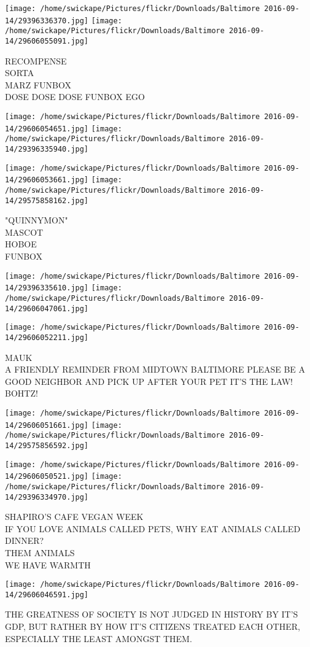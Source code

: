 \documentclass[10pt,letterpaper]{article}
\begin{document}
\texttt{[image: /home/swickape/Pictures/flickr/Downloads/Baltimore 2016-09-14/29396336370.jpg]}
\texttt{[image: /home/swickape/Pictures/flickr/Downloads/Baltimore 2016-09-14/29606055091.jpg]}

RECOMPENSE\\
SORTA\\
MARZ FUNBOX\\
DOSE DOSE DOSE FUNBOX EGO
\pagebreak

\texttt{[image: /home/swickape/Pictures/flickr/Downloads/Baltimore 2016-09-14/29606054651.jpg]}
\texttt{[image: /home/swickape/Pictures/flickr/Downloads/Baltimore 2016-09-14/29396335940.jpg]}

\texttt{[image: /home/swickape/Pictures/flickr/Downloads/Baltimore 2016-09-14/29606053661.jpg]}
\texttt{[image: /home/swickape/Pictures/flickr/Downloads/Baltimore 2016-09-14/29575858162.jpg]}

"QUINNYMON"\\
MASCOT\\
HOBOE\\
FUNBOX
\pagebreak

\texttt{[image: /home/swickape/Pictures/flickr/Downloads/Baltimore 2016-09-14/29396335610.jpg]}
\texttt{[image: /home/swickape/Pictures/flickr/Downloads/Baltimore 2016-09-14/29606047061.jpg]}

\vspace{0.25in}
\texttt{[image: /home/swickape/Pictures/flickr/Downloads/Baltimore 2016-09-14/29606052211.jpg]}

MAUK\\
A FRIENDLY REMINDER FROM MIDTOWN BALTIMORE PLEASE BE A GOOD NEIGHBOR AND PICK UP AFTER YOUR PET IT'S THE LAW!\\
BOHTZ!
\pagebreak

\texttt{[image: /home/swickape/Pictures/flickr/Downloads/Baltimore 2016-09-14/29606051661.jpg]}
\texttt{[image: /home/swickape/Pictures/flickr/Downloads/Baltimore 2016-09-14/29575856592.jpg]}

\texttt{[image: /home/swickape/Pictures/flickr/Downloads/Baltimore 2016-09-14/29606050521.jpg]}
\texttt{[image: /home/swickape/Pictures/flickr/Downloads/Baltimore 2016-09-14/29396334970.jpg]}

SHAPIRO'S CAFE VEGAN WEEK\\
IF YOU LOVE ANIMALS CALLED PETS, WHY EAT ANIMALS CALLED DINNER?\\
THEM ANIMALS\\
WE HAVE WARMTH
\pagebreak

\texttt{[image: /home/swickape/Pictures/flickr/Downloads/Baltimore 2016-09-14/29606046591.jpg]}

THE GREATNESS OF SOCIETY IS NOT JUDGED IN HISTORY BY IT'S GDP, BUT RATHER BY HOW IT'S CITIZENS TREATED EACH OTHER, ESPECIALLY THE LEAST AMONGST THEM.
\pagebreak
\end{document}
